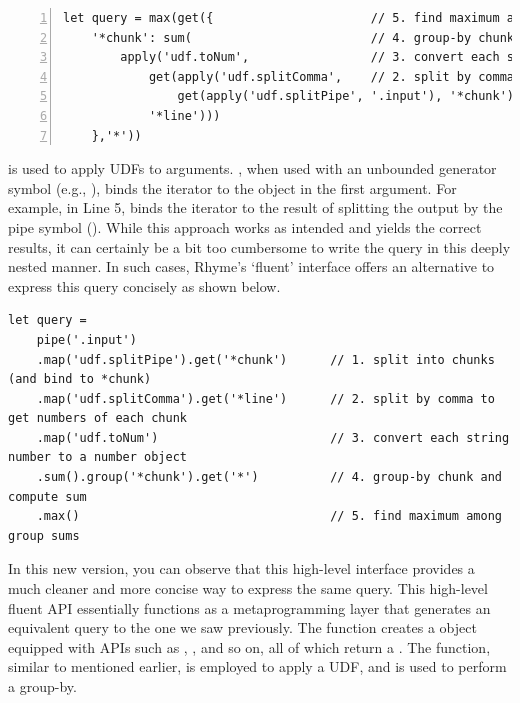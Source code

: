 \documentclass[runningheads]{llncs}
\newcommand{\lang}{Rhyme}
\begin{document}
\begin{lstlisting}[style=JavaScript, columns=flexible, numbers=left]
let query = max(get({                      // 5. find maximum among group sums
    '*chunk': sum(                         // 4. group-by chunk and compute sum
        apply('udf.toNum',                 // 3. convert each string number to a number object
            get(apply('udf.splitComma',    // 2. split by comma to get numbers of each chunk
                get(apply('udf.splitPipe', '.input'), '*chunk')), // 1. split into chunks
            '*line')))
    },'*'))
\end{lstlisting}

 is used to apply UDFs to arguments.
, when used with an unbounded generator symbol (e.g., ), binds the
iterator to the object in the first argument.
For example, in Line 5,  binds the iterator
 to the result of splitting the output by the pipe symbol (\inline{|}).
While this approach works as intended and yields the correct results, it can certainly be
a bit too cumbersome to write the query in this deeply nested manner.
In such cases, \lang{}'s `fluent' interface offers an alternative to express
this query concisely as shown below.


\begin{lstlisting}[style=JavaScript, columns=flexible]
let query =
    pipe('.input')
    .map('udf.splitPipe').get('*chunk')      // 1. split into chunks (and bind to *chunk)
    .map('udf.splitComma').get('*line')      // 2. split by comma to get numbers of each chunk
    .map('udf.toNum')                        // 3. convert each string number to a number object
    .sum().group('*chunk').get('*')          // 4. group-by chunk and compute sum
    .max()                                   // 5. find maximum among group sums
\end{lstlisting}


In this new version, you can observe that this high-level interface provides a
much cleaner and more concise way to express the same query. 
This high-level fluent API essentially functions as a metaprogramming layer
that generates an equivalent query to the one we saw previously.
The  function creates a  object equipped with
APIs such as , , and so on, all of which return a
.
The  function, similar to  mentioned earlier,
is employed to apply a UDF, and  is used to perform a group-by.
\end{document}
